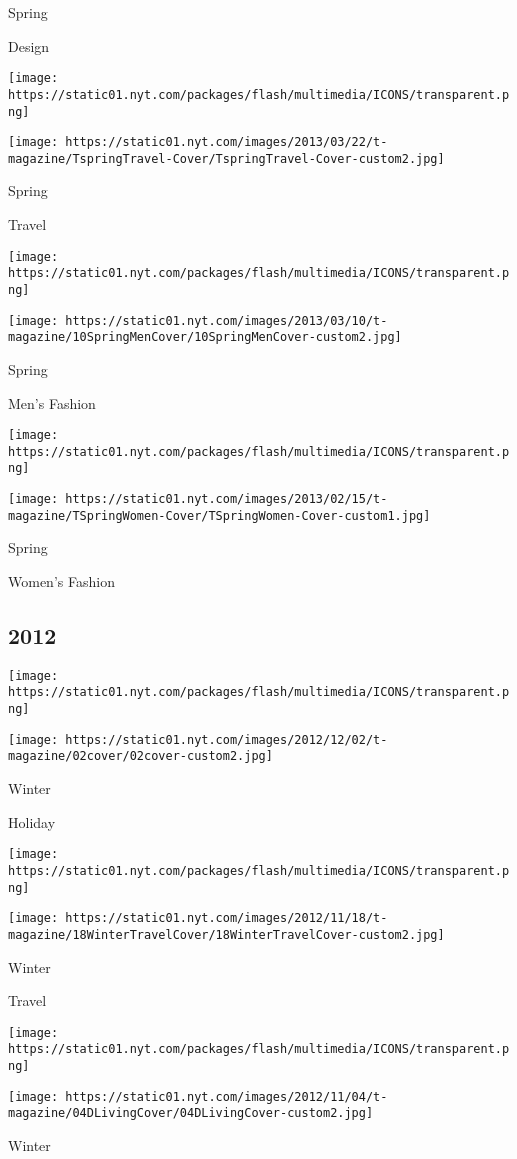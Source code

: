 Spring

Design

\texttt{[image: https://static01.nyt.com/packages/flash/multimedia/ICONS/transparent.png]}

\texttt{[image: https://static01.nyt.com/images/2013/03/22/t-magazine/TspringTravel-Cover/TspringTravel-Cover-custom2.jpg]}

Spring

Travel

\texttt{[image: https://static01.nyt.com/packages/flash/multimedia/ICONS/transparent.png]}

\texttt{[image: https://static01.nyt.com/images/2013/03/10/t-magazine/10SpringMenCover/10SpringMenCover-custom2.jpg]}

Spring

Men's Fashion

\texttt{[image: https://static01.nyt.com/packages/flash/multimedia/ICONS/transparent.png]}

\texttt{[image: https://static01.nyt.com/images/2013/02/15/t-magazine/TSpringWomen-Cover/TSpringWomen-Cover-custom1.jpg]}

Spring

Women's Fashion

\hypertarget{2012}{%
\subsection{2012}\label{2012}}

\texttt{[image: https://static01.nyt.com/packages/flash/multimedia/ICONS/transparent.png]}

\texttt{[image: https://static01.nyt.com/images/2012/12/02/t-magazine/02cover/02cover-custom2.jpg]}

Winter

Holiday

\texttt{[image: https://static01.nyt.com/packages/flash/multimedia/ICONS/transparent.png]}

\texttt{[image: https://static01.nyt.com/images/2012/11/18/t-magazine/18WinterTravelCover/18WinterTravelCover-custom2.jpg]}

Winter

Travel

\texttt{[image: https://static01.nyt.com/packages/flash/multimedia/ICONS/transparent.png]}

\texttt{[image: https://static01.nyt.com/images/2012/11/04/t-magazine/04DLivingCover/04DLivingCover-custom2.jpg]}

Winter

